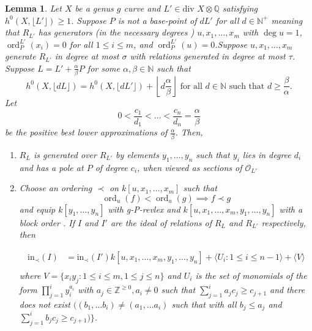 \documentclass{amsart}
\theoremstyle{plain}
\newtheorem{lem}[thm]{Lemma}
\theoremstyle{definition}
\theoremstyle{remark}
\numberwithin{equation}{section}
\newcommand\BQ{{\mathbb Q}}
\newcommand\so{{\mathscr O}}
\newcommand \di{\text{div }}
\DeclareMathOperator{\ord}{ord}
\newcommand \halfcan{L}
\newcommand \initial{\text{in}}
\begin{document}
\begin{lem}
\label{lem:sat-1}
Let $X$ be a genus $g$ curve and $\halfcan' \in \di X \otimes \BQ$
satisfying $h^0(X, \lfloor{\halfcan'}\rfloor)\ge 1$. Suppose $P$ is not a base-point of $d\halfcan'$ for all $d\in \mathbb{N}^+$ meaning that $R_{\halfcan'}$ has generators (in the necessary degrees )
$u, x_1, \ldots, x_m$ with $\deg u = 1$, $\ord_P^{\halfcan'}(x_i)=0$ for all $1 \leq i \leq m$, and $\ord_P^{\halfcan'}(u) = 0$.Suppose $u, x_1, \ldots, x_m$ generate $R_{\halfcan'}$ in degree at most $\sigma$ with relations generated
in degree at most $\tau$.  Suppose $\halfcan = \halfcan' + \frac{\alpha}{\beta} P$
for some $\alpha,\beta \in \mathbb{N}$ such that
\begin{equation}
\label{eqn:deg1_sat_ind_dim}
	h^0(X, \lfloor{d\halfcan}\rfloor) = h^0(X,\lfloor d\halfcan'
	\rfloor) + \left\lfloor d\frac{\alpha} {\beta} \right \rfloor \text{ for all } d \in \mathbb{
	N} \text{ such that } d \ge \frac{\beta}{\alpha}.
\end{equation}
\label{eqn:deg1-sat-ind}
Let 
\[
	0 < \frac{c_1}{d_1} < \ldots < \frac{c_n}{d_n} = \frac{\alpha}{\beta}
\]
be the positive best lower approximations of $\frac{\alpha}{\beta}$.
Then,

\begin{enumerate}
\item[(a)] $R_{\halfcan}$ is generated over $R_{\halfcan'}$ by elements $y_1, \ldots, y_n$ such that $y_i$ lies in  
degree $d_i$ and has a pole at $P$ of degree $c_i$, when viewed as sections of $\so_{\halfcan'}$ \todo{Clearer to say $\deg (y_i) = d_i,\ord_P^{L'} = c_i.$}

\item[(b)] Choose an ordering $\prec$ on $k[u, x_1, \ldots, x_m]$ such that
\[
	\ord_u(f) < \ord_u(g) \implies f\prec g
\]
and equip $k[y_1, \ldots, y_n]$ with g-P-revlex and $k[u, x_1, \ldots, x_m, y_1, \ldots, y_n]$ with a block order .
If $I$ and $I'$ are the ideal of relations of $R_{\halfcan}$ and $R_{\halfcan'}$ respectively, then 

\begin{align*}
	\initial_\prec(I) &= \initial_\prec(I') k[u, x_1, \ldots, x_m, y_1, \ldots, y_n] 
										 + \langle U_i: 1 \le i \le n-1 \rangle
										 + \langle V \rangle\\
\end{align*}
where 
$V=\{x_i y_j: 1\le i\le m, 1\le j\le n\}$
 and $U_i$ is the set of monomials of the form $\prod_{j=1}^{i} y_i^{a_i}$  with $a_j\in \mathbb{Z}^{\ge 0}, a_i\ne 0$  such that
$\sum_{j=1}^i a_j c_j \ge c_{j+1}$
and there does not exist $((b_1, \ldots b_i)\ne (a_1, \ldots a_i)$ such that with all $b_j\le a_j$ and 
$\sum_{j=1}^i b_jc_j\ge c_{j+1})\}$.   \\


\end{enumerate}
\end{lem}
\end{document}

